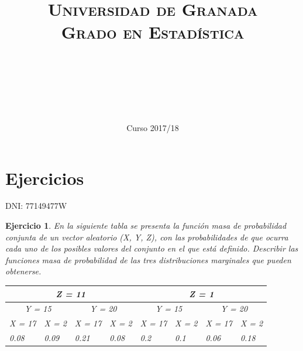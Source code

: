 \documentclass[11pt, a4paper]{article}
\title{
  \normalfont \normalsize 
  \textsc{Universidad de Granada} \\ [25pt]    %
  \textsc{Grado en Estadística} \\ [25pt]    %
  \horrule{0.5pt} \\[0.4cm] %
  \huge \sffamily\subject\\ %
  \horrule{2pt} \\[0.5cm] %
}
\author{\Large\sffamily{\docauthor}}
\date{\vspace{-1.5em} \normalsize \sffamily Curso 2017/18}
\newif\IfInSansMode
\theoremstyle{theorem-style}
\theoremstyle{definition-style}
\newtheorem{ejer}{Ejercicio}[section]
\theoremstyle{remark-style}
\theoremstyle{example-style}
\begin{document}
\maketitle  %
\vfill
\begin{center}
\end{center}
\newpage
\tableofcontents    %
\newpage



\section{Ejercicios}

DNI: 77149477W

\begin{ejer}
En la siguiente tabla se presenta la función masa de probabilidad conjunta de un vector aleatorio (X, Y, Z), con las
probabilidades de que ocurra cada uno de los posibles valores del conjunto en el que está definido. Describir las funciones
masa de probabilidad de las tres distribuciones marginales que pueden obtenerse.

\begin{table}[htb]
\centering
\begin{tabular}{|l|l|l|l|l|l|l|l|}
	\hline
	\multicolumn{4}{|c|}{Z = 11} & \multicolumn{4}{|c|}{Z = 1} \\ \hline
	\multicolumn{2}{|c|}{Y = 15} & \multicolumn{2}{|c|}{Y = 20} & \multicolumn{2}{|c|}{Y = 15} & \multicolumn{2}{|c|}{Y = 20}\\ \hline
	X = 17 & X = 2 & X = 17 & X = 2 & X = 17 & X = 2 & X = 17 & X = 2 \\ \hline
	0.08 & 0.09 & 0.21 & 0.08 & 0.2 & 0.1 & 0.06 & 0.18 \\ \hline
\end{tabular}
\end{table}

\end{ejer}
\end{document}
